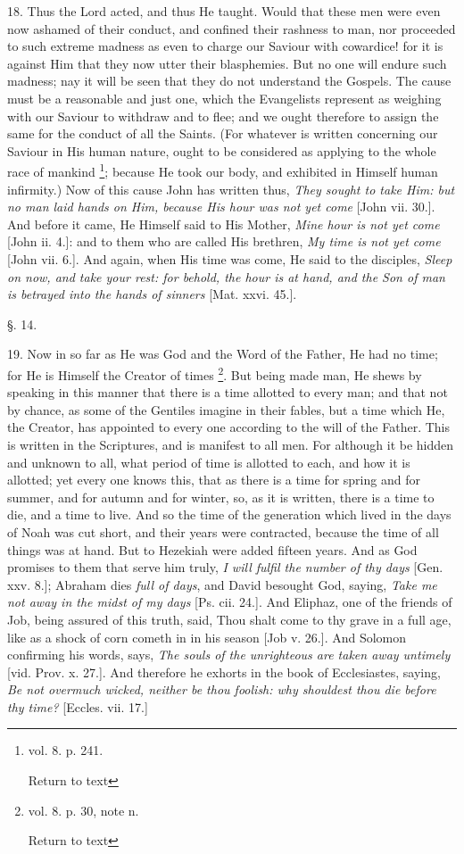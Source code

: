 18. Thus the Lord acted, and thus He taught.
Would that these men were even now ashamed of their conduct, and
confined their rashness to man, nor proceeded to such extreme madness
as even to charge our Saviour with cowardice! for it is against Him
that they now utter their blasphemies. But no one will endure such
madness; nay it will be seen that they do not understand the Gospels.
The cause must be a reasonable and just one, which the Evangelists
represent as weighing with our Saviour to withdraw and to flee; and we
ought therefore to assign the same for the conduct of all the Saints.
(For whatever is written concerning our Saviour in His human nature,
ought to be considered as applying to the whole race of mankind \footnote{vol. 8. p. 241.

Return to text}; because He took our body, and exhibited in Himself
human infirmity.) Now of this cause John has written thus, \emph{They
sought to take Him: but no man laid hands on Him, because His hour was
not yet come} [John vii. 30.]. And before it came, He Himself said
to His Mother, \emph{Mine hour is not yet come} [John ii. 4.]: and to
them who are called His brethren, \emph{My time is not yet come} [John
vii. 6.]. And again, when His time was come, He said to the disciples,
\emph{Sleep on now, and take your rest: for behold, the hour is at hand,
and the Son of man is betrayed into the hands of sinners} [Mat.
xxvi. 45.].

§. 14.

19. Now in so far as He was God and the Word of
the Father, He had no time; for He is Himself the Creator of times \footnote{vol. 8. p. 30, note n.

Return to text}. But being made man, He shews by speaking in this manner that
there is a time allotted to every man; and that not by chance, as some
of the Gentiles imagine in their fables, but a time which He, the
Creator, has appointed to every one according to the will of the
Father. This is written in the Scriptures, and is manifest to all men.
For although it be hidden and unknown to all, what period of time is
allotted to each, and how it is allotted; yet every one knows this,
that as there is a time for spring and for summer, and for autumn and
for winter, so, as it is written, there is a time to die, and a time
to live. And so the time of the generation which lived in the days of
Noah was cut short, and their years were contracted, because the time
of all things was at hand. But to Hezekiah were added fifteen years.
And as God promises to them that serve him truly, \emph{I will fulfil the
number of thy days} [Gen. xxv. 8.]; Abraham dies \emph{full of days},
and David besought God, saying, \emph{Take me not away in the midst of my
days} [Ps. cii. 24.]. And Eliphaz, one of the friends of Job, being
assured of this truth, said, Thou shalt come to thy grave in a full
age, like as a shock of corn cometh in in his season [Job v. 26.]. And
Solomon confirming his words, says, \emph{The souls of the unrighteous
are taken away untimely} [vid. Prov. x. 27.]. And therefore he
exhorts in the book of Ecclesiastes, saying, \emph{Be not overmuch
wicked, neither be thou foolish: why shouldest thou die before thy
time?} [Eccles. vii. 17.]

